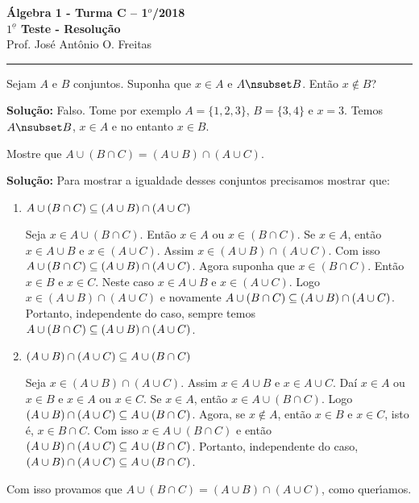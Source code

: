 \documentclass[12pt]{article}
\begin{document}


\begin{center}
{\Large\bf {\'A}lgebra 1 - Turma C -- 1$^{o}$/2018} \\ \vspace{9pt} {\large\bf
  $1^{\underline{o}}$ Teste - Resolu\c{c}\~ao}\\
\vspace{9pt} Prof. Jos{\'e} Ant{\^o}nio O. Freitas
\end{center}
\hrule

\vspace{.6cm}


\vspace{.6cm}

\questao Sejam $A$ e $B$ conjuntos. Suponha que $x \in A$ e $A \nsub B$. Então $x \notin B$?

\noindent\textbf{Solu\c{c}\~ao:} Falso. Tome por exemplo $A = \{1,2,3\}$, $B = \{3,4\}$ e $x = 3$. Temos $A \nsub B$, $x \in A$ e no entanto $x \in B$.

\vspace{.5cm}

\questao Mostre que $A \cup ( B \cap C) = (A \cup B) \cap (A \cup C)$.

\noindent\textbf{Solu\c{c}\~ao:} Para mostrar a igualdade desses conjuntos precisamos mostrar que:
\begin{enumerate}[label={\roman*})]
	\item $A \cup ( B \cap C) \subseteq (A \cup B) \cap (A \cup C)$

	Seja $x \in A \cup ( B \cap C)$. Ent\~ao $x \in A$ ou $x \in (B \cap C)$. Se $x \in A$, ent\~ao $x \in A \cup B$ e $x \in (A \cup C)$. Assim $x \in (A \cup B) \cap (A \cup C)$. Com isso $A \cup ( B \cap C) \subseteq (A \cup B) \cap (A \cup C)$. Agora suponha que $x \in (B \cap C)$. Ent\~ao $x \in B$ e $x \in C$. Neste caso $x \in A \cup B$ e $x \in (A \cup C)$. Logo $x \in (A \cup B) \cap (A \cup C)$ e novamente $A \cup ( B \cap C) \subseteq (A \cup B) \cap (A \cup C)$. Portanto, independente do caso, sempre temos $A \cup ( B \cap C) \subseteq (A \cup B) \cap (A \cup C)$.

	\item $(A \cup B) \cap (A \cup C) \subseteq A \cup ( B \cap C)$

	Seja $x \in (A \cup B) \cap (A \cup C)$. Assim $x \in A \cup B$ e $x \in A \cup C$. Daí $x \in A$ ou $x \in B$ e $x \in A$ ou $x \in C$. Se $x \in A$, então $x \in A \cup (B \cap C)$. Logo $(A \cup B) \cap (A \cup C) \subseteq A \cup ( B \cap C)$. Agora, se $x \notin A$, então $x \in B$ e $x \in C$, isto é, $x \in B \cap C$. Com isso $x \in A \cup (B \cap C)$ e então $(A \cup B) \cap (A \cup C) \subseteq A \cup ( B \cap C)$. Portanto, independente do caso, $(A \cup B) \cap (A \cup C) \subseteq A \cup ( B \cap C)$.
\end{enumerate}
Com isso provamos que $A \cup ( B \cap C) = (A \cup B) \cap (A \cup C)$, como quer{\'\i}amos.
\end{document}
